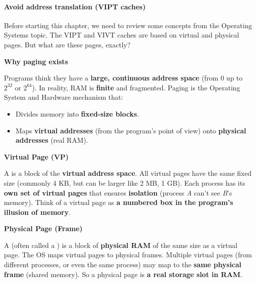 \paragraph{Avoid address translation (VIPT caches)}

\begin{remarkbox}\label{remarkbox: VA and PP}
    Before starting this chapter, we need to review some concepts from the Operating Systems topic. The VIPT and VIVT caches are based on virtual and physical pages. But what are these pages, exactly?

    \highspace
    \begin{flushleft}
        \textcolor{Green3}{ \textbf{Why paging exists}}
    \end{flushleft}
    Programs think they have a \textbf{large, continuous address space} (from 0 up to $2^{32}$ or $2^{64}$). In reality, RAM is \textbf{finite} and fragmented. Paging is the Operating System and Hardware mechanism that:
    \begin{itemize}
        \item Divides memory into \textbf{fixed-size blocks}.
        \item Maps \textbf{virtual addresses} (from the program's point of view) onto \textbf{physical addresses} (real RAM).
    \end{itemize}

    \highspace
    \begin{flushleft}
        \textcolor{Green3}{ \textbf{Virtual Page (VP)}}
    \end{flushleft}
    A  is a block of the \textbf{virtual address space}. All virtual pages have the same fixed size (commonly 4 KB, but can be larger like 2 MB, 1 GB). Each process has its \textbf{own set of virtual pages} that ensures \textbf{isolation} (process \emph{A} can't see \emph{B}'s memory). Think of a virtual page as \textbf{a numbered box in the program's illusion of memory}.

    \highspace
    \begin{flushleft}
        \textcolor{Green3}{ \textbf{Physical Page (Frame)}}
    \end{flushleft}
    A  (often called a ) is a block of \textbf{physical RAM} of the same size as a virtual page. The OS maps virtual pages to physical frames. Multiple virtual pages (from different processes, or even the same process) may map to the \textbf{same physical frame} (shared memory). So a physical page is \textbf{a real storage slot in RAM}.


\end{remarkbox}
